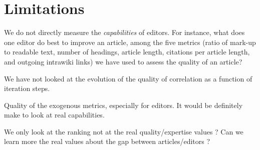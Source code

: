 \section{Limitations}

We do not directly measure the {\it capabilities} of editors. For instance, what does one editor do best to improve an article, among the five metrics (ratio of mark-up to readable text, number of headings, article length, citations per article length, and outgoing intrawiki links) we have used to assess the quality of an article? 

We have not looked at the evolution of the quality of correlation as a function of iteration steps.

Quality of the exogenous metrics, especially for editors. It would be definitely make to look at real capabilities.

We only look at the ranking not at the real quality/expertise values ? Can we learn more the real values about the gap between articles/editors ?

